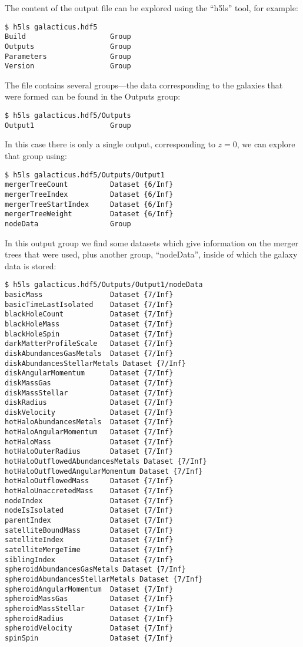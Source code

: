 The content of the output file can be explored using the ``{\normalfont \ttfamily h5ls}'' tool, for example:
\begin{verbatim}
$ h5ls galacticus.hdf5
Build                    Group
Outputs                  Group
Parameters               Group
Version                  Group
\end{verbatim}
The file contains several groups---the data corresponding to the galaxies that were formed can be found in the {\normalfont \ttfamily Outputs} group:
\begin{verbatim}
$ h5ls galacticus.hdf5/Outputs
Output1                  Group
\end{verbatim}
In this case there is only a single output, corresponding to $z=0$, we can explore that group using:
\begin{verbatim}
$ h5ls galacticus.hdf5/Outputs/Output1
mergerTreeCount          Dataset {6/Inf}
mergerTreeIndex          Dataset {6/Inf}
mergerTreeStartIndex     Dataset {6/Inf}
mergerTreeWeight         Dataset {6/Inf}
nodeData                 Group
\end{verbatim}
In this output group we find some datasets which give information on the merger trees that were used, plus another group, ``{\normalfont \ttfamily nodeData}'', inside of which the galaxy data is stored:
\begin{verbatim}
$ h5ls galacticus.hdf5/Outputs/Output1/nodeData
basicMass                Dataset {7/Inf}
basicTimeLastIsolated    Dataset {7/Inf}
blackHoleCount           Dataset {7/Inf}
blackHoleMass            Dataset {7/Inf}
blackHoleSpin            Dataset {7/Inf}
darkMatterProfileScale   Dataset {7/Inf}
diskAbundancesGasMetals  Dataset {7/Inf}
diskAbundancesStellarMetals Dataset {7/Inf}
diskAngularMomentum      Dataset {7/Inf}
diskMassGas              Dataset {7/Inf}
diskMassStellar          Dataset {7/Inf}
diskRadius               Dataset {7/Inf}
diskVelocity             Dataset {7/Inf}
hotHaloAbundancesMetals  Dataset {7/Inf}
hotHaloAngularMomentum   Dataset {7/Inf}
hotHaloMass              Dataset {7/Inf}
hotHaloOuterRadius       Dataset {7/Inf}
hotHaloOutflowedAbundancesMetals Dataset {7/Inf}
hotHaloOutflowedAngularMomentum Dataset {7/Inf}
hotHaloOutflowedMass     Dataset {7/Inf}
hotHaloUnaccretedMass    Dataset {7/Inf}
nodeIndex                Dataset {7/Inf}
nodeIsIsolated           Dataset {7/Inf}
parentIndex              Dataset {7/Inf}
satelliteBoundMass       Dataset {7/Inf}
satelliteIndex           Dataset {7/Inf}
satelliteMergeTime       Dataset {7/Inf}
siblingIndex             Dataset {7/Inf}
spheroidAbundancesGasMetals Dataset {7/Inf}
spheroidAbundancesStellarMetals Dataset {7/Inf}
spheroidAngularMomentum  Dataset {7/Inf}
spheroidMassGas          Dataset {7/Inf}
spheroidMassStellar      Dataset {7/Inf}
spheroidRadius           Dataset {7/Inf}
spheroidVelocity         Dataset {7/Inf}
spinSpin                 Dataset {7/Inf}
\end{verbatim}
